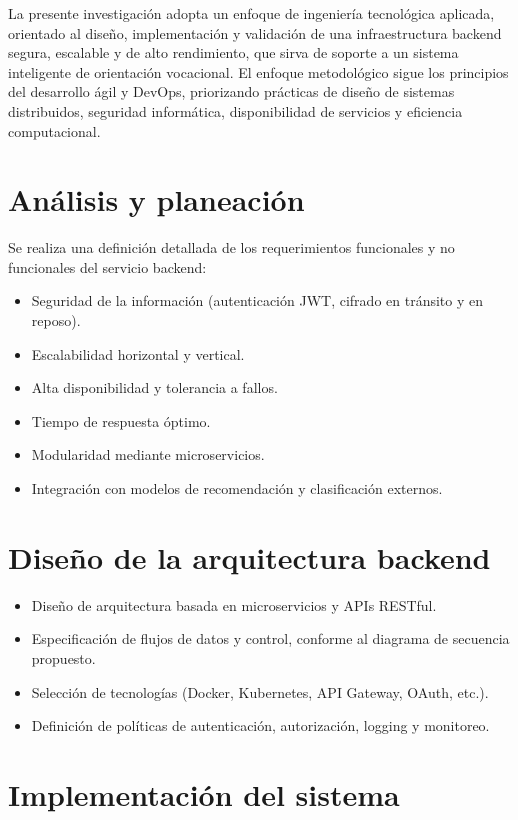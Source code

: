 La presente investigación adopta un enfoque de ingeniería tecnológica aplicada, orientado al diseño, implementación y validación de una infraestructura backend segura, escalable y de alto rendimiento, que sirva de soporte a un sistema inteligente de orientación vocacional. El enfoque metodológico sigue los principios del desarrollo ágil y DevOps, priorizando prácticas de diseño de sistemas distribuidos, seguridad informática, disponibilidad de servicios y eficiencia computacional.

\section{Análisis y planeación}

Se realiza una definición detallada de los requerimientos funcionales y no funcionales del servicio backend:

\begin{itemize}
    \item Seguridad de la información (autenticación JWT, cifrado en tránsito y en reposo).
    \item Escalabilidad horizontal y vertical.
    \item Alta disponibilidad y tolerancia a fallos.
    \item Tiempo de respuesta óptimo.
    \item Modularidad mediante microservicios.
    \item Integración con modelos de recomendación y clasificación externos.
\end{itemize}

\section{Diseño de la arquitectura backend}

\begin{itemize}
    \item Diseño de arquitectura basada en microservicios y APIs RESTful.
    \item Especificación de flujos de datos y control, conforme al diagrama de secuencia propuesto.
    \item Selección de tecnologías (Docker, Kubernetes, API Gateway, OAuth, etc.).
    \item Definición de políticas de autenticación, autorización, logging y monitoreo.
\end{itemize}

\section{Implementación del sistema}

